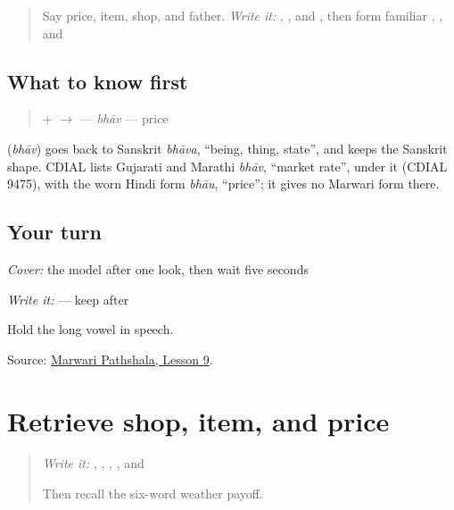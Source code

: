 \label{lesson:MW-C13-bhaav}



\begin{quote}
Say price, item, shop, and father. \emph{Write it:} \textbf{}, \textbf{}, and \textbf{}, then form familiar \textbf{}, \textbf{}, and \textbf{}
\end{quote}

\subsection*{What to know first}
\begin{quote}
\textbf{} + \textbf{} $\to$ \textbf{} — \emph{bhāv} — price
\end{quote}

\begin{cousinweb}
\textbf{} (\emph{bhāv}) goes back to Sanskrit \emph{bhāva}, \textquotedblleft{}being, thing, state\textquotedblright{}, and keeps the Sanskrit shape. CDIAL lists Gujarati and Marathi \emph{bhāv}, \textquotedblleft{}market rate\textquotedblright{}, under it (CDIAL 9475), with the worn Hindi form \emph{bhāu}, \textquotedblleft{}price\textquotedblright{}; it gives no Marwari form there.
\end{cousinweb}

\subsection*{Your turn}
\emph{Cover:} the model after one look, then wait five seconds

\emph{Write it:} \textbf{} — keep \textbf{} after \textbf{}

Hold the long vowel in speech.

\begin{tcolorbox}[breakable,colback=teal!4,colframe=teal!35!black,title={Before you move on}]
Source: \href{https://www.marwaripathshala.com/marwari-lesson-9-english}{Marwari Pathshala, Lesson 9}.
\end{tcolorbox}
\section[Practice]{Retrieve shop, item, and price}

\label{lesson:MW-R13-shopping-three}



\begin{quote}
\emph{Write it:} \textbf{}, \textbf{}, \textbf{}, \textbf{}, and \textbf{}

Then recall the six-word weather payoff.
\end{quote}

